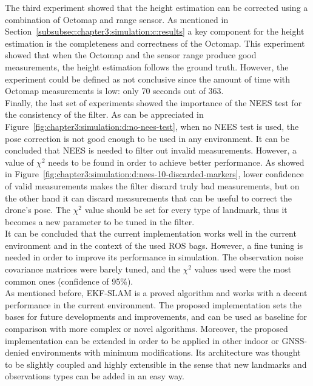 The third experiment showed that the height estimation can be corrected using a combination of Octomap and range sensor. As mentioned in Section~\ref{subsubsec:chapter3:simulation:c:results} a key component for the height estimation is the completeness and correctness of the Octomap. This experiment showed that when the Octomap and the sensor range produce good measurements, the height estimation follows the ground truth. However, the experiment could be defined as not conclusive since the amount of time with Octomap measurements is low: only 70 seconds out of 363.\\

Finally, the last set of experiments showed the importance of the \ac{NEES} test for the consistency of the filter. As can be appreciated in Figure~\ref{fig:chapter3:simulation:d:no-nees-test}, when no \ac{NEES} test is used, the pose correction is not good enough to be used in any environment. It can be concluded that \ac{NEES} is needed to filter out invalid measurements. However, a value of $\chi^2$ needs to be found in order to achieve better performance. As showed in Figure~\ref{fig:chapter3:simulation:d:nees-10-discarded-markers}, lower confidence of valid measurements makes the filter discard truly bad measurements, but on the other hand it can discard measurements that can be useful to correct the drone's pose. The $\chi^2$ value should be set for every type of landmark, thus it becomes a new parameter to be tuned in the filter.\\

It can be concluded that the current implementation works well in the current environment and in the context of the used \ac{ROS} bags. However, a fine tuning is needed in order to improve its performance in simulation. The observation noise covariance matrices were barely tuned, and the $\chi^2$ values used were the most common ones (confidence of 95\%).\\

As mentioned before, EKF-SLAM is a proved algorithm and works with a decent performance in the current environment. The proposed implementation sets the bases for future developments and improvements, and can be used as baseline for comparison with more complex or novel algorithms. Moreover, the proposed implementation can be extended in order to be applied in other indoor or GNSS-denied environments with minimum modifications. Its architecture was thought to be slightly coupled and highly extensible in the sense that new landmarks and observations types can be added in an easy way.


